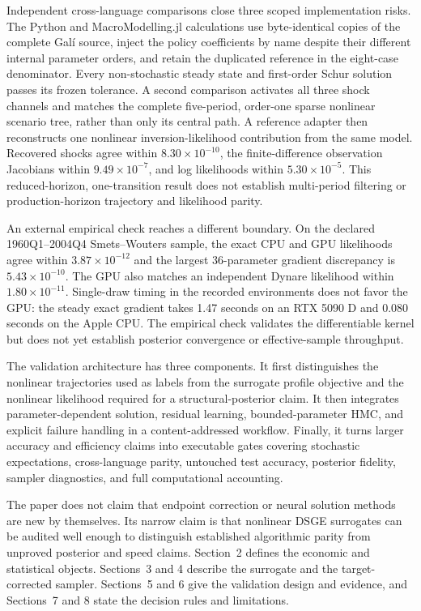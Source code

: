 \documentclass[11pt]{article}
\begin{document}
Independent cross-language comparisons close three scoped implementation risks.
The Python and MacroModelling.jl calculations use byte-identical copies of the
complete Gal\'i source, inject the policy coefficients by name despite their
different internal parameter orders, and retain the duplicated reference in the
eight-case denominator. Every non-stochastic steady state and first-order Schur
solution passes its frozen tolerance. A second comparison activates all three
shock channels and matches the complete five-period, order-one sparse nonlinear
scenario tree, rather than only its central path. A reference adapter then
reconstructs one nonlinear inversion-likelihood contribution from the same
model. Recovered shocks agree within $8.30\times10^{-10}$, the finite-difference
observation Jacobians within $9.49\times10^{-7}$, and log likelihoods within
$5.30\times10^{-5}$. This reduced-horizon, one-transition result does not
establish multi-period filtering or production-horizon trajectory and
likelihood parity.

An external empirical check reaches a different boundary. On the declared
1960Q1--2004Q4 Smets--Wouters sample, the exact CPU and GPU likelihoods agree
within $3.87\times10^{-12}$ and the largest 36-parameter gradient discrepancy is
$5.43\times10^{-10}$. The GPU also matches an independent Dynare likelihood
within $1.80\times10^{-11}$. Single-draw timing in the recorded environments
does not favor the GPU: the
steady exact gradient takes 1.47 seconds on an RTX 5090 D and 0.080 seconds on
the Apple CPU. The empirical check validates the differentiable kernel but
does not yet establish posterior convergence or effective-sample throughput.

The validation architecture has three components. It first distinguishes the
nonlinear trajectories used as labels from the surrogate profile objective and
the nonlinear likelihood required for a structural-posterior claim. It then
integrates parameter-dependent solution, residual learning, bounded-parameter
HMC, and explicit failure handling in a content-addressed workflow. Finally,
it turns larger accuracy and efficiency claims into executable gates covering
stochastic expectations, cross-language parity, untouched test accuracy,
posterior fidelity, sampler diagnostics, and full computational accounting.

The paper does not claim that endpoint correction or neural solution methods
are new by themselves. Its narrow claim is that nonlinear DSGE surrogates can
be audited well enough to distinguish established algorithmic parity from
unproved posterior and speed claims. Section~2 defines the economic and
statistical objects. Sections~3 and 4 describe the surrogate and the
target-corrected sampler. Sections~5 and 6 give the validation design and
evidence, and Sections~7 and 8 state the decision rules and limitations.
\end{document}
